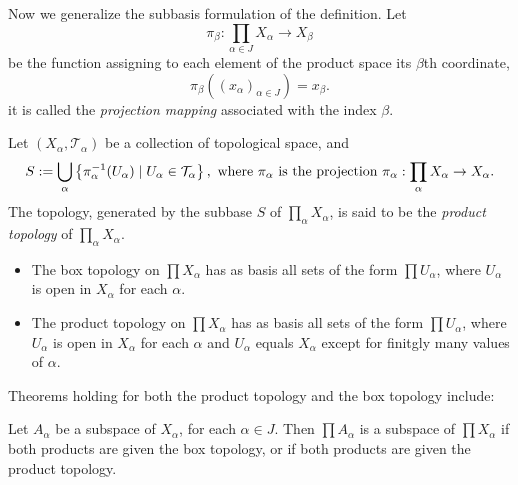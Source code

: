 Now we generalize the subbasis formulation of the definition.
Let
\[
  \pi_\beta: \prod_{\alpha \in J} X_\alpha \to X_{\beta}
\]
be the function assigning to each element of the product space its \( \beta \)th coordinate,
\[
  \pi_\beta((x_\alpha)_{\alpha \in J}) = x_\beta.
\]
it is called the \emph{projection mapping} associated with the index \( \beta \).

\begin{definition}
  Let \( (X_\alpha, \mathcal{T}_\alpha) \) be a collection of topological space, and
  \[
    S := \bigcup_\alpha \left\lbrace \pi^{-1}_\alpha(U_\alpha) \mid U_\alpha \in \mathcal{T}_\alpha \right\rbrace, \textmd{ where } \pi_\alpha \textmd{ is the projection } \pi_\alpha: \prod_\alpha X_\alpha \to X_\alpha.
  \]
  The topology, generated by the subbase \( S \) of \( \prod_\alpha X_\alpha \), is said to be the \emph{product topology} of \( \prod_\alpha X_\alpha \).
\end{definition}

\begin{theorem}
  \begin{itemize}
    \item The box topology on \( \prod X_\alpha \) has as basis all sets of the form \( \prod U_\alpha \), where \( U_\alpha \) is open in \( X_\alpha \) for each \( \alpha \).
    \item The product topology on \( \prod X_\alpha \) has as basis all sets of the form \( \prod U_\alpha \), where \( U_\alpha \) is open in \( X_\alpha \) for each \( \alpha \) and \( U_\alpha \) equals \( X_\alpha \) except for finitgly many values of \( \alpha \).
  \end{itemize}
\end{theorem}

\noindent Theorems holding for both the product topology and the box topology include:

\begin{theorem}
  Let \( A_\alpha \) be a subspace of \( X_\alpha \), for each \( \alpha \in J \).
  Then \( \prod A_\alpha \) is a subspace of \( \prod X_\alpha \) if both products are given the box topology, or if both products are given the product topology.
\end{theorem}

